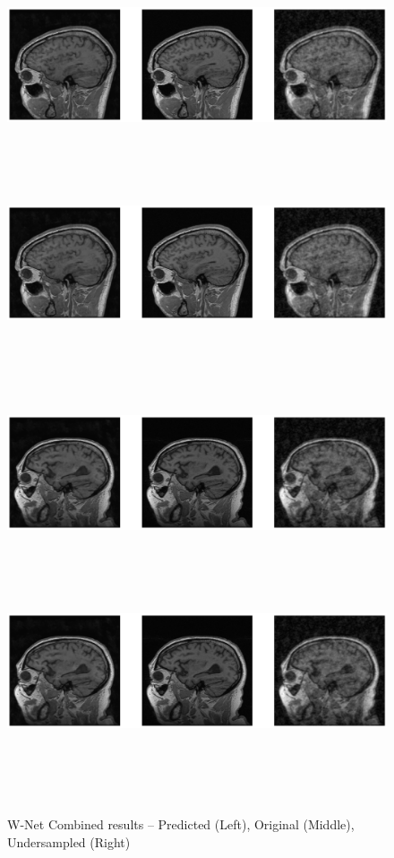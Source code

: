 \vspace*{0.5cm}
\begin{figure}[!htbp]
  \begin{center}
    \leavevmode
    \ifpdf
      \includegraphics[height=1.5in]{Chapter4/images/res1.png}
    \else
      \includegraphics[bb = 92 86 545 742, height=3in]{Chapter4/images/res1.png}
    \fi
  \end{center}

  \begin{center}
    \leavevmode
    \ifpdf
      \includegraphics[height=1.5in]{Chapter4/images/res2.png}
    \else
      \includegraphics[bb = 92 86 545 742, height=3in]{Chapter4/images/res2.png}
    \fi
    \caption{W-Net Combined results -- Predicted (Left), Original (Middle), Undersampled (Right)}
    \label{Result W-Net Combined}
  \end{center}
\end{figure}

